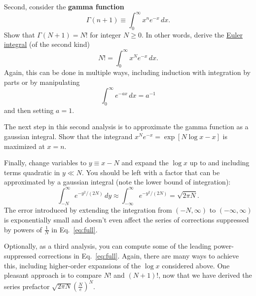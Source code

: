 \documentclass[12 pt]{article} %
\newcommand{\Ga}{\ensuremath{\Gamma} }
\newcommand{\eq}[1]{Eq.~\ref{#1}}
\begin{document}
Second, consider the \textbf{gamma function}
\begin{equation*}
  \Ga(n + 1) \equiv \int_0^{\infty} x^n e^{-x} \, dx.
\end{equation*}
Show that $\Ga(N + 1) = N!$ for integer $N \geq 0$.
In other words, derive the \href{https://en.wikipedia.org/wiki/Euler_integral}{Euler integral} (of the second kind)
\begin{equation}
  N! = \int_0^{\infty} x^N e^{-x} \, dx.
\end{equation}
Again, this can be done in multiple ways, including induction with integration by parts or by manipulating
\begin{equation*}
  \int_0^{\infty} e^{-ax} \, dx = a^{-1}
\end{equation*}
and then setting $a = 1$.

\newpage
The next step in this second analysis is to approximate the gamma function as a gaussian integral.
Show that the integrand $x^N e^{-x} = \exp\left[N\log x - x\right]$ is maximized at $x = n$.

Finally, change variables to $y \equiv x - N$ and expand the $\log x$ up to and including terms quadratic in $y \ll N$.
You should be left with a factor that can be approximated by a gaussian integral (note the lower bound of integration):
\begin{equation*}
  \int_{-N}^{\infty} e^{-y^2 / (2N)} \, dy \approx \int_{-\infty}^{\infty} e^{-y^2 / (2N)} = \sqrt{2\pi N}.
\end{equation*}
The error introduced by extending the integration from $(-N, \infty)$ to  $(-\infty, \infty)$ is exponentially small and doesn't even affect the series of corrections suppressed by powers of $\frac{1}{N}$ in \eq{eq:full}.

Optionally, as a third analysis, you can compute some of the leading power-suppressed corrections in \eq{eq:full}.
Again, there are many ways to achieve this, including higher-order expansions of the $\log x$ considered above.
One pleasant approach is to compare $N!$ and $(N + 1)!$, now that we have derived the series prefactor $\sqrt{2\pi N} \left(\frac{N}{e}\right)^N$.
\end{document}
